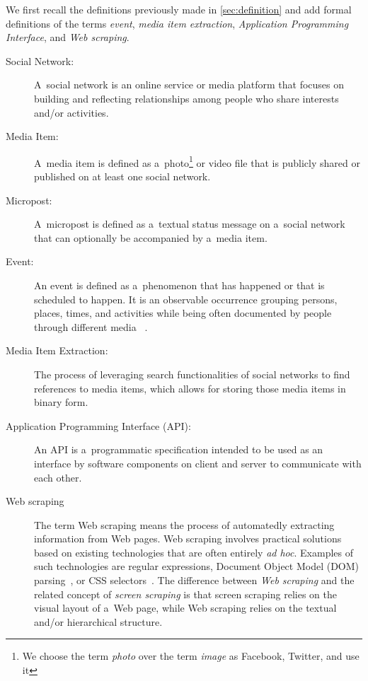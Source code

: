 We first recall the definitions previously made in
\autoref{sec:definition} and add formal definitions
of the terms \emph{event},
\emph{media item extraction},
\emph{Application Programming Interface},
and \emph{Web scraping}.

\begin{description}
  \item[Social Network:]
       A~social network is an online service or media platform
       that focuses on building and reflecting
       relationships among people
       who share interests and/or activities.
  \item[Media Item:]
       A~media item is defined as
       a~photo\footnote{We choose the term \emph{photo}
       over the term \emph{image} as
       Facebook, Twitter, and \googleplus use it}
       or video file that is publicly shared or published
       on at least one social network.
  \item[Micropost:]
       A~micropost is defined as a~textual status message
       on a~social network
       that can optionally be accompanied by a~media item.
  \item[Event:]
       An event is defined as a~phenomenon that has happened
       or that is scheduled to happen.
       It is an observable occurrence grouping persons,
       places, times, and activities while being often
       documented by people through different media~%
       \cite{liu2011events}.
  \item[Media Item Extraction:]
       The process of leveraging search functionalities of
       social networks to find references to media items,
       which allows for storing those media items in binary form.
  \item[Application Programming Interface (API):]
       An API is a~programmatic specification intended to be used
       as an interface by software components on client and server
       to communicate with each other.
  \item[Web scraping]
       The term Web scraping means the process of
       automatedly extracting information from Web pages.
       Web scraping involves practical solutions based on
       existing technologies that are often entirely \emph{ad hoc}.
       Examples of such technologies are regular expressions,
       Document Object Model (DOM)
       parsing~\cite{lehors2004dom},
       or CSS selectors~\cite{hunt2012cssselectors}.
       The difference between \emph{Web scraping}
       and the related concept of \emph{screen scraping}
       is that screen scraping relies on the visual layout of a~Web page,
       while Web scraping relies on the textual
       and/or hierarchical structure.
\end{description}

